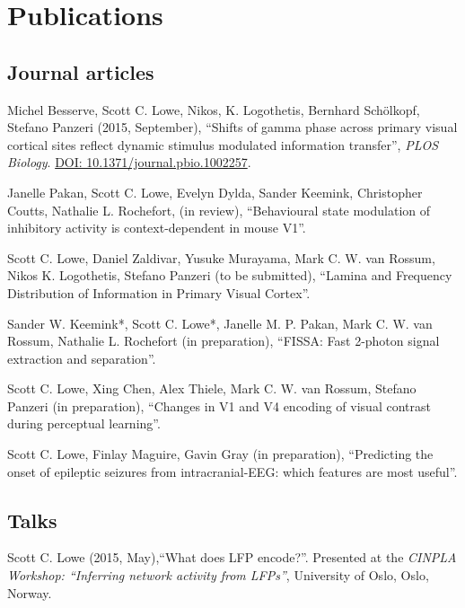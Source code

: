\documentclass[11pt, a4paper]{article} %
\renewenvironment{itemize}{
  \begin{list}{}{
    \setlength{\leftmargin}{0em}
  }
}{
  \end{list}
}
\begin{document}

\section*{Publications}
%
%
\subsection*{Journal articles}
%
\begin{itemize}
%
\item
Michel Besserve, Scott C. Lowe, Nikos, K. Logothetis, Bernhard Sch\"{o}lkopf, Stefano Panzeri (2015, September), ``Shifts of gamma phase across primary visual cortical sites reflect dynamic stimulus modulated information transfer'', \emph{PLOS Biology}. \href{https://doi.org/10.1371/journal.pbio.1002257}{DOI: 10.1371/journal.pbio.1002257}.
%
\item
Janelle Pakan, Scott C. Lowe, Evelyn Dylda, Sander Keemink, Christopher Coutts, Nathalie L. Rochefort, (in review), ``Behavioural state modulation of inhibitory activity is context-dependent in mouse V1''.
%
\item
Scott C. Lowe, Daniel Zaldivar, Yusuke Murayama, Mark C. W. van Rossum, Nikos K. Logothetis, Stefano Panzeri (to be submitted), ``Lamina and Frequency Distribution of Information in Primary Visual Cortex''.
%
\item
Sander W. Keemink*, Scott C. Lowe*, Janelle M. P. Pakan, Mark C. W. van Rossum, Nathalie L. Rochefort (in preparation), ``FISSA: Fast 2-photon signal extraction and separation''.
%
\item
Scott C. Lowe, Xing Chen, Alex Thiele, Mark C. W. van Rossum, Stefano Panzeri (in preparation), ``Changes in V1 and V4 encoding of visual contrast during perceptual learning''.
%
\item
Scott C. Lowe, Finlay Maguire, Gavin Gray (in preparation), ``Predicting the onset of epileptic seizures from intracranial-EEG: which features are most useful''.
%
\end{itemize}
%
%
\subsection*{Talks}
%
\begin{itemize}
%
\item
Scott C. Lowe (2015, May),``What does LFP encode?''.
{Presented at the \emph{CINPLA Workshop: ``Inferring network activity from LFPs''}, University of Oslo, Oslo, Norway.}
%
\end{itemize}
\end{document}
